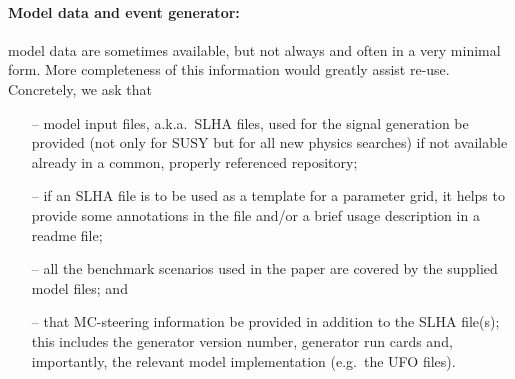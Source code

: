 \documentclass[a4paper,aps,prd,longbibliography,notitlepage,showpacs,amsmath,amssymb,superscriptaddress,nofootinbib,floatfix,11pt,preprintnumbers]{revtex4-1-mod}
\newcommand{\eg}{e.g.\xspace}
\begin{document}
\paragraph{Model data and event generator:}
model data are sometimes available, but not always and often in a very minimal form. More completeness of this information would greatly assist re-use. Concretely, we ask that
\begin{itemize}
  \item[--] model input files, a.k.a.~\textsf{SLHA} files, used for the signal generation be provided (not only for SUSY but for all new physics searches) if not available already in a common, properly referenced repository;
  \item[--] if an \textsf{SLHA} file is to be used as a template for a parameter grid, it helps to provide some annotations in the file and/or a brief usage description in a \textsf{readme} file;
  \item[--] all the benchmark scenarios used in the paper are covered by the supplied model files;    and
  \item[--] that MC-steering information be provided in addition to the \textsf{SLHA} file(s); this includes the generator version number,  generator run cards and,  importantly, the relevant model implementation (\eg~the UFO files).
\end{itemize}

\end{document}
